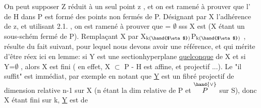 On peut supposer Z réduit à un seul point z , et on est ramené à
prouver que l' de H dans P est formé  des points non fermés de P.
Désignant par X l'adhérence de z, et utilisant 2.1. , on est ramené à
prouver que \hand{$_\eta$} = $\emptyset$ sss X est   (X étant un sous-schém%
fermé  de P). Remplaçant X par X$_{\text{k(\hand{$\eta$})}}$\hand{$\hookrightarrow$}P$_{\text{k(\hand{$\eta$})}}$ ,   résulte du fait
\margin{$|$}suivant, pour lequel nous devons avoir une référence, et qui mérite d'être
réex ici en lemme: si Y est une sectionhyperplane \uline{quelconque} de
X et si Y\hand{$_\eta$}=$\emptyset$ , alors X est fini ( en effet, X $\subset$ P - H est affine, et
projectif ...). Le "il suffit" est immédiat, par exemple en notant que
\uline{Y} est un fibré projectif de dimension relative n-1 sur X (n étant la
dim relative de P  et $\overset{\hand{\vee}}{P}$ sur S), donc X étant fini sur k, \uline{Y} est de

